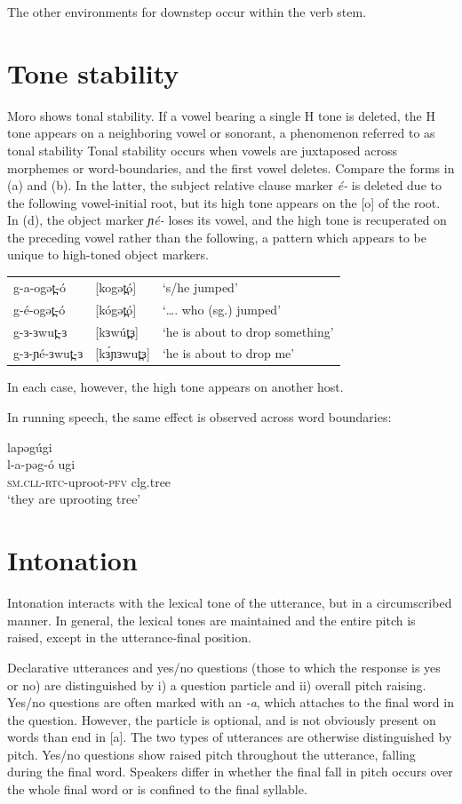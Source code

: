 The other environments for downstep occur within the verb stem. 

\section{Tone stability}
Moro shows tonal stability. If a vowel bearing a single H tone is deleted, the H tone appears on a neighboring vowel or sonorant, a phenomenon referred to as tonal stability Tonal stability occurs when vowels are juxtaposed across morphemes or word-boundaries, and the first vowel deletes. Compare the forms in (a) and (b). In the latter, the subject relative clause marker \textit{é-} is deleted due to the following vowel-initial root, but its high tone appears on the [o] of the root. In (d), the object marker \textit{ɲé-} loses its vowel, and the high tone is recuperated on the preceding vowel rather than the following, a pattern which appears to be unique to high-toned object markers. 

\ea
\begin{tabular}[t]{lll}
g-a-ogət̪-ó	&	[kogət̪ó]	&	‘s/he jumped’\\
g-é-ogət̪-ó	&	[kógət̪ó]	&	‘…. who (sg.) jumped’\\
g-ɜ-ɜwut̪-ɜ	&	[kɜwút̪ɜ]	&	‘he is about to drop something’\\
g-ɜ-ɲé-ɜwut̪-ɜ&	[kɜ́ɲɜwut̪ɜ]	&	‘he is about to drop me’\\
\end{tabular}
\z

In each case, however, the high tone appears on another host.

In running speech, the same effect is observed across word boundaries:

\ea	lapəgúgi\\
	\gll l-a-pəg-ó ugi 	 \\
	\textsc{sm.cll}-\textsc{rtc}-uproot-\textsc{pfv}	 clg.tree	 \\
	\trans ‘they are uprooting tree’
\z

\section{Intonation}
Intonation interacts with the lexical tone of the utterance, but in a circumscribed manner. In general, the lexical tones are maintained and the entire pitch is raised, except in the utterance-final position. 

Declarative utterances and yes/no questions (those to which the response is yes or no) are distinguished by i) a question particle and ii) overall pitch raising. Yes/no questions are often marked with an \textit{-a}, which attaches to the final word in the question. However, the particle is optional, and is not obviously present on words than end in [a]. The two types of utterances are otherwise distinguished by pitch. Yes/no questions show raised pitch throughout the utterance, falling during the final word. Speakers differ in whether the final fall in pitch occurs over the whole final word or is confined to the final syllable. 

